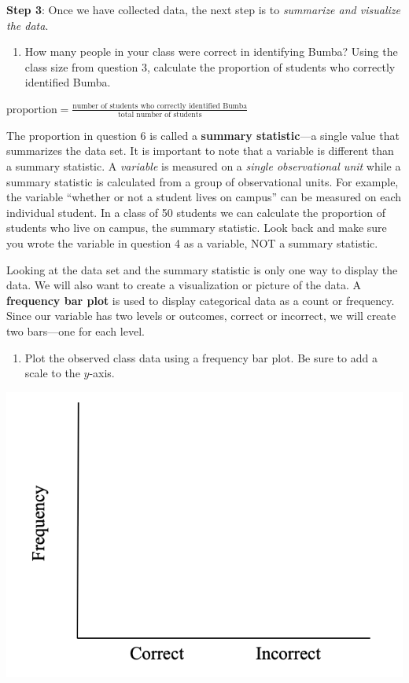 \documentclass[
]{report}
\providecommand{\tightlist}{%
  \setlength{\itemsep}{0pt}\setlength{\parskip}{0pt}}
\begin{document}
\textbf{Step 3}: Once we have collected data, the next step is to \emph{summarize and visualize the data}.

\begin{enumerate}
\def\labelenumi{\arabic{enumi}.}
\setcounter{enumi}{5}
\tightlist
\item
  How many people in your class were correct in identifying Bumba? Using the class size from question 3, calculate the proportion of students who correctly identified Bumba.
\end{enumerate}

\begin{center}
$\mbox{proportion} = \frac{\mbox{number of students who correctly identified Bumba}}{\mbox{total number of students}}$
\end{center}

\vspace{0.7in}

The proportion in question 6 is called a \textbf{summary statistic}---a single value that summarizes the data set. It is important to note that a variable is different than a summary statistic. A \emph{variable} is measured on a \emph{single observational unit} while a summary statistic is calculated from a group of observational units. For example, the variable ``whether or not a student lives on campus'' can be measured on each individual student. In a class of 50 students we can calculate the proportion of students who live on campus, the summary statistic. Look back and make sure you wrote the variable in question 4 as a variable, NOT a summary statistic.

Looking at the data set and the summary statistic is only one way to display the data. We will also want to create a visualization or picture of the data. A \textbf{frequency bar plot} is used to display categorical data as a count or frequency. Since our variable has two levels or outcomes, correct or incorrect, we will create two bars---one for each level.

\begin{enumerate}
\def\labelenumi{\arabic{enumi}.}
\setcounter{enumi}{6}
\tightlist
\item
  Plot the observed class data using a frequency bar plot. Be sure to add a scale to the \(y\)-axis.
\end{enumerate}

\begin{center}\includegraphics[width=0.4\linewidth]{images/barplot_martian} \end{center}
\end{document}
